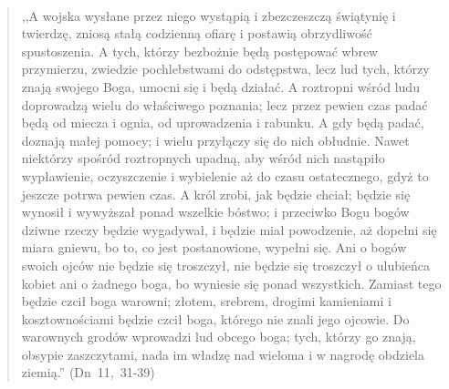\documentclass[10pt,a4paper,oneside]{article}
\begin{document}
\paragraph{}
\begin{quote}
,,A wojska wysłane przez niego wystąpią i zbezczeszczą świątynię i twierdzę, zniosą stałą codzienną ofiarę i postawią obrzydliwość spustoszenia. A tych, którzy bezbożnie będą postępować wbrew przymierzu, zwiedzie pochlebstwami do odstępstwa, lecz lud tych, którzy znają swojego Boga, umocni się i będą działać. A roztropni wśród ludu doprowadzą wielu do właściwego poznania; lecz przez pewien czas padać będą od miecza i ognia, od uprowadzenia i rabunku. A gdy będą padać, doznają małej pomocy; i wielu przyłączy się do nich obłudnie. Nawet niektórzy spośród roztropnych upadną, aby wśród nich nastąpiło wypławienie, oczyszczenie i wybielenie aż do czasu ostatecznego, gdyż to jeszcze potrwa pewien czas. A król zrobi, jak będzie chciał; będzie się wynosił i wywyższał ponad wszelkie bóstwo; i przeciwko Bogu bogów dziwne rzeczy będzie wygadywał, i będzie miał powodzenie, aż dopełni się miara gniewu, bo to, co jest postanowione, wypełni się. Ani o bogów swoich ojców nie będzie się troszczył, nie będzie się troszczył o ulubieńca kobiet ani o żadnego boga, bo wyniesie się ponad wszystkich. Zamiast tego będzie czcił boga warowni; złotem, srebrem, drogimi kamieniami i kosztownościami będzie czcił boga, którego nie znali jego ojcowie. Do warownych grodów wprowadzi lud obcego boga; tych, którzy go znają, obsypie zaszczytami, nada im władzę nad wieloma i w nagrodę obdziela ziemią.'' \mbox{(Dn 11, 31-39)}
\end{quote}
\end{document}
